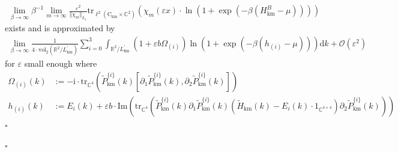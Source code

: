 \begin{exa}
\begin{con}
\begin{align*}
  \lim_{\beta \to \infty}
  \beta^{-1}
  \lim_{m\to\infty}
  \frac{\varepsilon^{2}}{\Vert \chi_{m} \Vert_{L_{1}}}
  \mathrm{tr}_{\ell^{2}(\mathrm{C}_{\textrm{km}} \times \mathbb{C}^{2})}
  \left(
    \chi_{m}(\varepsilon x)
    \cdot
    \ln
    \left(
      1
      +
      \exp
      \left(
        -
        \beta
        \left(
          H_{\textrm{km}}^{B}
          -
          \mu
        \right)
      \right)
    \right)
  \right)
\end{align*}
exists and is approximated by
\begin{align*}
  \lim_{\beta \to \infty}
  \frac{1}{4 \cdot \mathrm{vol}_{2}(\mathbb{R}^{2}/L_{\textrm{km}}^{\prime})}
  \sum_{i=0}^{3}
  \int_{\mathbb{R}^{2}/L_{\textrm{km}}^{\prime}}
  \left(
    1
    +
    \varepsilon
    b
    \Omega_{(i)}
  \right)
  \ln
  \left(
    1
    +
    \exp
    \left(
      -
      \beta
      \left(
        h_{(i)}
        -
        \mu
      \right)
    \right)
  \right)
  \mathrm{d}k
  +
  \mathcal{O}(\varepsilon^{2})
\end{align*}
for $\varepsilon$ small enough where
\begin{align*}
  \Omega_{(i)}(k)
  &:=
  -
  \mathrm{i}
  \cdot
  \mathrm{tr}_{\mathbb{C}^{4}}
  \left(
    \tilde{P}_{\textrm{km}}^{\lbrace i \rbrace}(k)
    \left[
      \partial_{1}
      \tilde{P}_{\textrm{km}}^{\lbrace i \rbrace}(k),
      \partial_{2}
      \tilde{P}_{\textrm{km}}^{\lbrace i \rbrace}(k)
    \right]
  \right)
  \\
  h_{(i)}(k)
  &:=
  E_{i}(k)
  +
  \varepsilon
  b
  \cdot
  \mathrm{Im}
  \left(
    \mathrm{tr}_{\mathbb{C}^{4}}
    \left(
      \tilde{P}_{\textrm{km}}^{\lbrace i \rbrace}(k)
      \partial_{1}
      \tilde{P}_{\textrm{km}}^{\lbrace i \rbrace}(k)
      \left(
        \tilde{H}_{\textrm{km}}(k)
        -
        E_{i}(k)
        \cdot
        1_{\mathbb{C}^{4 \times 4}}
      \right)
      \partial_{2}
      \tilde{P}_{\textrm{km}}^{\lbrace i \rbrace}(k)
    \right)
  \right)
\end{align*}
\phantom{proven}
\hfill
$\square$
\end{con}
\phantom{proven}
\hfill
$\square$
\end{exa}
